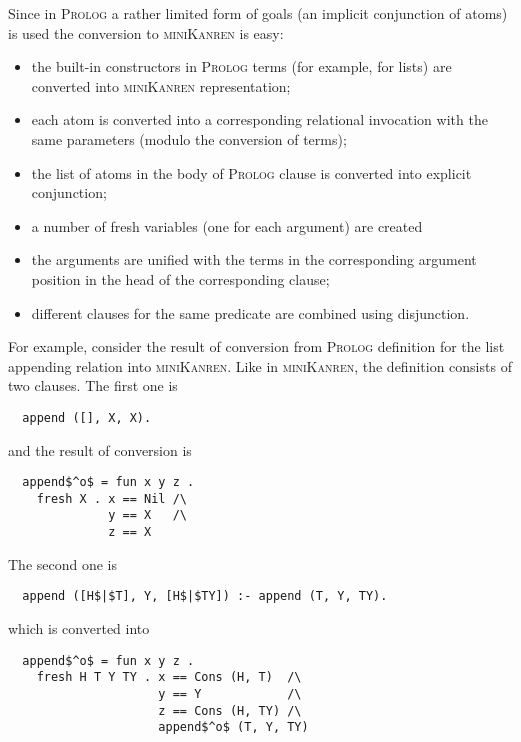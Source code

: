 { \color{orange}

Since in \textsc{Prolog} a rather limited form of goals (an implicit conjunction of atoms) is used the conversion to \textsc{miniKanren} is easy:

\begin{itemize}
  \item the built-in constructors in \textsc{Prolog} terms (for example, for lists) are converted into \textsc{miniKanren} representation;
  \item each atom is converted into a corresponding relational invocation with the same parameters (modulo the conversion of terms);
  \item the list of atoms in the body of \textsc{Prolog} clause is converted into explicit conjunction;
  \item a number of fresh variables (one for each argument) are created
  \item the arguments are unified with the terms in the corresponding
    argument position in the head of the corresponding clause;
  \item different clauses for the same predicate are combined using disjunction.
\end{itemize}

For example, consider the result of conversion from \textsc{Prolog} definition for the list appending relation into \textsc{miniKanren}.
Like in \textsc{miniKanren}, the definition consists of two clauses. The first one is

\begin{lstlisting}
  append ([], X, X).
\end{lstlisting}

and the result of conversion is

\begin{lstlisting}
  append$^o$ = fun x y z .
    fresh X . x == Nil /\
              y == X   /\
              z == X
\end{lstlisting}

The second one is

\begin{lstlisting}
  append ([H$|$T], Y, [H$|$TY]) :- append (T, Y, TY).
\end{lstlisting}

which is converted into

\begin{lstlisting}
  append$^o$ = fun x y z .
    fresh H T Y TY . x == Cons (H, T)  /\
                     y == Y            /\
                     z == Cons (H, TY) /\
                     append$^o$ (T, Y, TY)
\end{lstlisting}

}
